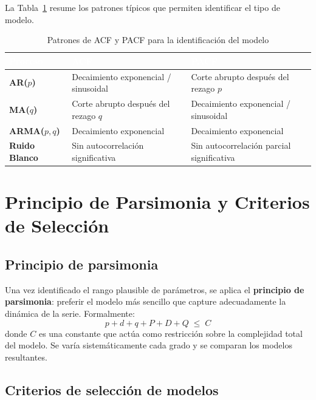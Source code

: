 \documentclass[12pt,a4paper]{article}
\begin{document}
La Tabla~\ref{tab:acf_pacf} resume los patrones típicos que permiten identificar
el tipo de modelo.

\begin{table}[H]
  \centering
  \caption{Patrones de ACF y PACF para la identificación del modelo}
  \label{tab:acf_pacf}
  \begin{tabular}{>{\bfseries}l p{4.5cm} p{4.5cm}}
    \toprule
    \rowcolor{upnavy}
    \textcolor{white}{Proceso} &
    \textcolor{white}{ACF} &
    \textcolor{white}{PACF} \\
    \midrule
    AR($p$)  & Decaimiento exponencial / sinusoidal & Corte abrupto después del rezago $p$ \\
    MA($q$)  & Corte abrupto después del rezago $q$ & Decaimiento exponencial / sinusoidal \\
    ARMA($p,q$) & Decaimiento exponencial & Decaimiento exponencial \\
    Ruido Blanco & Sin autocorrelación significativa & Sin autocorrelación parcial significativa \\
    \bottomrule
  \end{tabular}
\end{table}

\section{Principio de Parsimonia y Criterios de Selección}

\subsection{Principio de parsimonia}

Una vez identificado el rango plausible de parámetros, se aplica el
\textbf{principio de parsimonia}: preferir el modelo más sencillo que capture
adecuadamente la dinámica de la serie. Formalmente:
\begin{equation}
  \boxed{p + d + q + P + D + Q \;\leq\; C}
\end{equation}
donde $C$ es una constante que actúa como restricción sobre la complejidad total del
modelo. Se varía sistemáticamente cada grado y se comparan los modelos resultantes.

\subsection{Criterios de selección de modelos}
\end{document}
